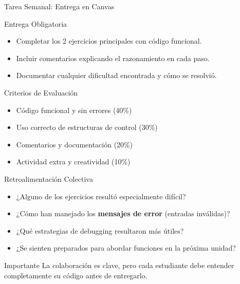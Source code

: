 \documentclass[10pt]{beamer}
\begin{document}
\begin{frame}{Tarea Semanal: Entrega en Canvas}
  \begin{block}{Entrega Obligatoria}
    \begin{itemize}
      \item Completar los 2 ejercicios principales con código funcional.
      \item Incluir comentarios explicando el razonamiento en cada paso.
      \item Documentar cualquier dificultad encontrada y cómo se resolvió.
    \end{itemize}
  \end{block}
  
  \begin{block}{Criterios de Evaluación}
    \begin{itemize}
      \item Código funcional y sin errores (40\%)
      \item Uso correcto de estructuras de control (30\%)
      \item Comentarios y documentación (20\%)
      \item Actividad extra y creatividad (10\%)
    \end{itemize}
  \end{block}
\end{frame}

\begin{frame}{Retroalimentación Colectiva}
  \begin{itemize}
    \item ¿Alguno de los ejercicios resultó especialmente difícil?
    \item ¿Cómo han manejado los \textbf{mensajes de error} (entradas inválidas)?
    \item ¿Qué estrategias de debugging resultaron más útiles?
    \item ¿Se sienten preparados para abordar funciones en la próxima unidad?
  \end{itemize}
  
  \begin{alertblock}{Importante}
    La colaboración es clave, pero cada estudiante debe entender completamente su código antes de entregarlo.
  \end{alertblock}
\end{frame}
\end{document}
